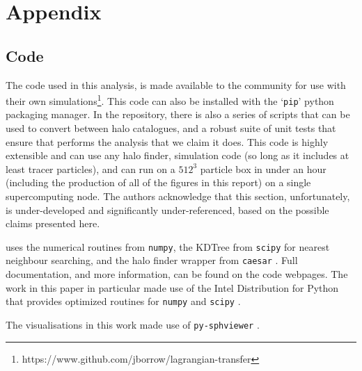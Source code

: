 \section{Appendix}
\label{sec:appendix}

\subsection{Code}
\label{app:code}

The code used in this analysis, \ltcaesar{} is made available to the
community for use with their own
simulations\footnote{https://www.github.com/jborrow/lagrangian-transfer}.
This code can also be installed with the `{\tt pip}' python packaging
manager. In the repository, there is also a series of scripts that can be
used to convert between halo catalogues, and a robust suite of unit tests
that ensure that \ltcaesar{} performs the analysis that we claim it does.
This code is highly extensible and can use any halo finder, simulation code
(so long as it includes at least tracer particles), and can run on a $512^3$
particle box in under an hour (including the production of all of the figures
in this report) on a single supercomputing node. The authors acknowledge that
this section, unfortunately, is under-developed and significantly
under-referenced, based on the possible claims presented here.

\ltcaesar{} uses the numerical routines from {\tt numpy}, the KDTree from
{\tt scipy} for nearest neighbour searching, and the halo finder wrapper from
{\tt caesar} \citep{NumPy2018, Jones2001, Thompson2018}. Full documentation,
and more information, can be found on the code webpages. The work in this paper
in particular made use of the Intel Distribution for Python that provides
optimized routines for {\tt numpy} and {\tt scipy} \citep{Pavlyk2017}.

The visualisations in this work made use of {\tt py-sphviewer}
\citep{Benitez-Llambay2015}.


